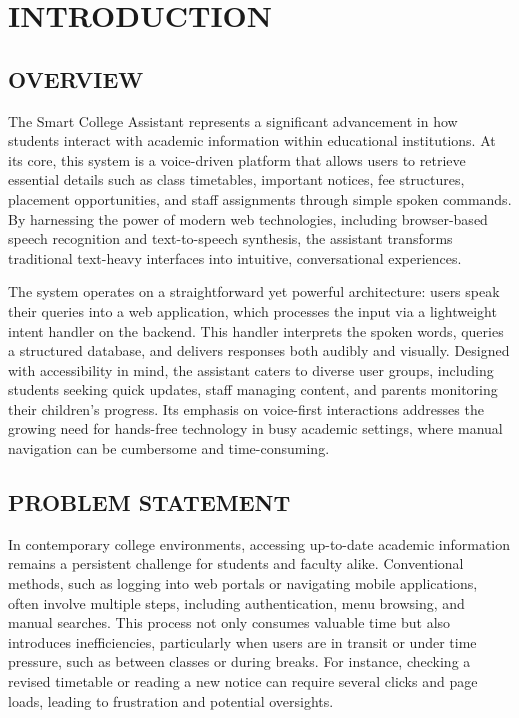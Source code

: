 \documentclass{article}
\begin{document}
\tableofcontents
\listoffigures
\listoftables

\section{INTRODUCTION}

\subsection{OVERVIEW}
The Smart College Assistant represents a significant advancement in how students interact with academic information within educational institutions. At its core, this system is a voice-driven platform that allows users to retrieve essential details such as class timetables, important notices, fee structures, placement opportunities, and staff assignments through simple spoken commands. By harnessing the power of modern web technologies, including browser-based speech recognition and text-to-speech synthesis, the assistant transforms traditional text-heavy interfaces into intuitive, conversational experiences.

The system operates on a straightforward yet powerful architecture: users speak their queries into a web application, which processes the input via a lightweight intent handler on the backend. This handler interprets the spoken words, queries a structured database, and delivers responses both audibly and visually. Designed with accessibility in mind, the assistant caters to diverse user groups, including students seeking quick updates, staff managing content, and parents monitoring their children's progress. Its emphasis on voice-first interactions addresses the growing need for hands-free technology in busy academic settings, where manual navigation can be cumbersome and time-consuming.

\subsection{PROBLEM STATEMENT}
In contemporary college environments, accessing up-to-date academic information remains a persistent challenge for students and faculty alike. Conventional methods, such as logging into web portals or navigating mobile applications, often involve multiple steps, including authentication, menu browsing, and manual searches. This process not only consumes valuable time but also introduces inefficiencies, particularly when users are in transit or under time pressure, such as between classes or during breaks. For instance, checking a revised timetable or reading a new notice can require several clicks and page loads, leading to frustration and potential oversights.
\end{document}
